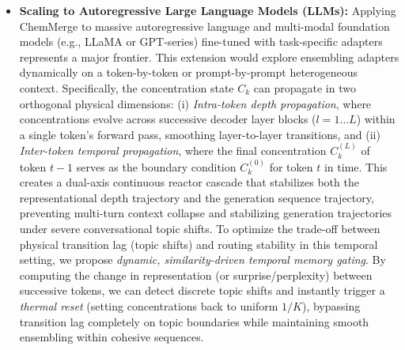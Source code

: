 \begin{itemize}
\begin{enumerate}
        \item \textbf{Parallel Activation Blending (CAB):} Inside the parallel forward pass, we load and execute the specialized LoRAs in parallel, multiplying their output activations by their respective blending coefficients $\alpha_k^{(l)}$ and adding them to the base representation. This end-to-end serving setup will be evaluated under diverse streaming heterogeneity conditions, demonstrating ChemMerge's ability to avoid parameter interference, maintain optimal routing, and suppress representation jitter without requiring any stateful queueing or batch buffering.
    \end{enumerate}
    
    \item \textbf{Scaling to Autoregressive Large Language Models (LLMs):} 
    Applying ChemMerge to massive autoregressive language and multi-modal foundation models (e.g., LLaMA or GPT-series) fine-tuned with task-specific adapters represents a major frontier. 
    This extension would explore ensembling adapters dynamically on a token-by-token or prompt-by-prompt heterogeneous context. 
    Specifically, the concentration state $C_k$ can propagate in two orthogonal physical dimensions: (i) \emph{Intra-token depth propagation}, where concentrations evolve across successive decoder layer blocks ($l = 1 \dots L$) within a single token's forward pass, smoothing layer-to-layer transitions, and (ii) \emph{Inter-token temporal propagation}, where the final concentration $C_k^{(L)}$ of token $t-1$ serves as the boundary condition $C_k^{(0)}$ for token $t$ in time. 
    This creates a dual-axis continuous reactor cascade that stabilizes both the representational depth trajectory and the generation sequence trajectory, preventing multi-turn context collapse and stabilizing generation trajectories under severe conversational topic shifts. 
    To optimize the trade-off between physical transition lag (topic shifts) and routing stability in this temporal setting, we propose \emph{dynamic, similarity-driven temporal memory gating}. 
    By computing the change in representation (or surprise/perplexity) between successive tokens, we can detect discrete topic shifts and instantly trigger a \emph{thermal reset} (setting concentrations back to uniform $1/K$), bypassing transition lag completely on topic boundaries while maintaining smooth ensembling within cohesive sequences.

\end{itemize}
